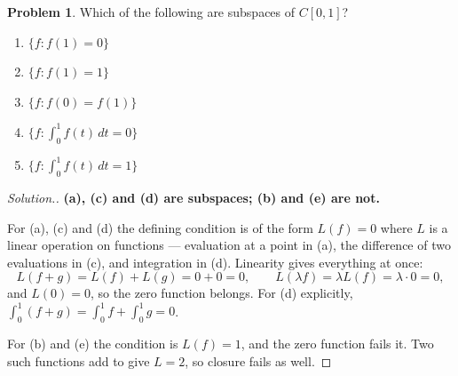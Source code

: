 \documentclass[11pt,a4paper]{article}
\theoremstyle{definition}
\newtheorem{problemx}{Problem}[section]
\newenvironment{problem}{\begin{problemx}}{\end{problemx}}
\newenvironment{solution}
  {\renewcommand{\qedsymbol}{}\begin{proof}[\textit{Solution}.]}
  {\end{proof}}
\begin{document}
\begin{problem}
Which of the following are subspaces of $C[0,1]$?
\begin{enumerate}
\item[(a)] $\{f: f(1)=0\}$ \qquad
\item[(b)] $\{f: f(1)=1\}$ \qquad
\item[(c)] $\{f: f(0)=f(1)\}$
\item[(d)] $\{f: \int_0^1 f(t)\,dt=0\}$ \qquad
\item[(e)] $\{f: \int_0^1 f(t)\,dt=1\}$
\end{enumerate}
\end{problem}
\begin{solution}
\textbf{(a), (c) and (d) are subspaces; (b) and (e) are not.}

For (a), (c) and (d) the defining condition is of the form $L(f)=0$ where $L$
is a linear operation on functions --- evaluation at a point in (a), the
difference of two evaluations in (c), and integration in (d). Linearity gives
everything at once:
$$L(f+g)=L(f)+L(g)=0+0=0,\qquad L(\lambda f)=\lambda L(f)=\lambda\cdot 0=0,$$
and $L(0)=0$, so the zero function belongs. For (d) explicitly,
$\int_0^1(f+g)=\int_0^1 f+\int_0^1 g=0$.

For (b) and (e) the condition is $L(f)=1$, and the zero function fails it. Two
such functions add to give $L=2$, so closure fails as well.
\end{solution}
\end{document}
